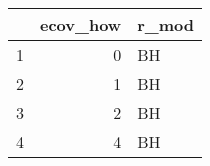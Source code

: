 \begin{table}[ht]
\centering
\begin{tabular}{rrl}
  \hline
 & ecov\_how & r\_mod \\ 
  \hline
1 &   0 & BH \\ 
  2 &   1 & BH \\ 
  3 &   2 & BH \\ 
  4 &   4 & BH \\ 
   \hline
\end{tabular}
\end{table}
